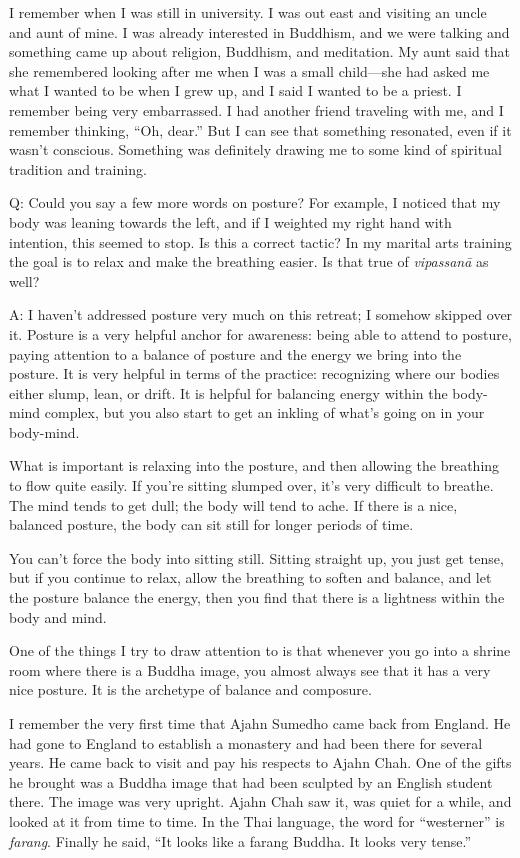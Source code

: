 I remember when I was still in university. I was out east and visiting
an uncle and aunt of mine. I was already interested in Buddhism, and we
were talking and something came up about religion, Buddhism, and
meditation. My aunt said that she remembered looking after me when I was
a small child—she had asked me what I wanted to be when I grew up, and I
said I wanted to be a priest. I remember being very embarrassed. I had
another friend traveling with me, and I remember thinking, “Oh, dear.”
But I can see that something resonated, even if it wasn’t conscious.
Something was definitely drawing me to some kind of spiritual tradition
and training.

\qaspace
Q: Could you say a few more words on posture? For example, I noticed
that my body was leaning towards the left, and if I weighted my right
hand with intention, this seemed to stop. Is this a correct tactic? In
my marital arts training the goal is to relax and make the breathing
easier. Is that true of \emph{vipassanā} as well?

\qaspace
A: I haven’t addressed posture very much on this retreat; I somehow
skipped over it. Posture is a very helpful anchor for awareness: being
able to attend to posture, paying attention to a balance of posture and
the energy we bring into the posture. It is very helpful in terms of the
practice: recognizing where our bodies either slump, lean, or drift. It
is helpful for balancing energy within the body-mind complex, but you
also start to get an inkling of what’s going on in your body-mind.

What is important is relaxing into the posture, and then allowing the
breathing to flow quite easily. If you’re sitting slumped over, it’s
very difficult to breathe. The mind tends to get dull; the body will
tend to ache. If there is a nice, balanced posture, the body can sit
still for longer periods of time.

You can’t force the body into sitting still. Sitting straight up, you
just get tense, but if you continue to relax, allow the breathing to
soften and balance, and let the posture balance the energy, then you
find that there is a lightness within the body and mind.

One of the things I try to draw attention to is that whenever you go
into a shrine room where there is a Buddha image, you almost always see
that it has a very nice posture. It is the archetype of balance and
composure.

I remember the very first time that Ajahn Sumedho came back from
England. He had gone to England to establish a monastery and had been
there for several years. He came back to visit and pay his respects to
Ajahn Chah. One of the gifts he brought was a Buddha image that had been
sculpted by an English student there. The image was very upright. Ajahn
Chah saw it, was quiet for a while, and looked at it from time to time.
In the Thai language, the word for “westerner” is \emph{farang}. Finally
he said, “It looks like a farang Buddha. It looks very tense.”

